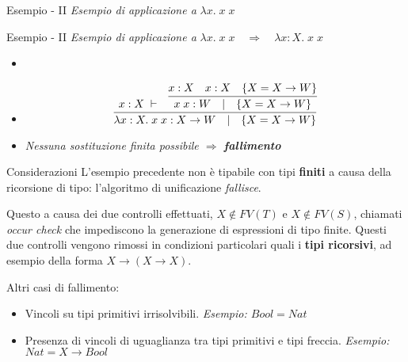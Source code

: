 \documentclass{beamer}
\begin{document}
\begin{tframe}{Esempio - II}
\emph{Esempio di applicazione a } $\lambda x.\; x \; x$
\end{tframe}

\begin{tframe}{Esempio - II}
\emph{Esempio di applicazione a } $\lambda x.\; x \; x \quad \Rightarrow \quad \lambda x : X.\; x \; x $
\begin{itemize}
\item<1->[]
\item<2->[]
\begin{displaymath}
\infer{\lambda x : X. \; x \; x : X \rightarrow W \quad | \quad \{ X = X \rightarrow W \}}{x : X \; \vdash & \infer{x \; x : W \quad | \quad \{X = X \rightarrow W \}}{x : X & x : X & \{X = X \rightarrow W\}}}
\end{displaymath}
\item<2->[] \vspace{0.8cm}\emph{Nessuna sostituzione finita possibile $\Rightarrow$ \textbf{fallimento}}
\end{itemize}
\end{tframe}


\begin{tframe}{Considerazioni}
L'esempio precedente non è tipabile con tipi \textbf{finiti} a causa della ricorsione di tipo: l'algoritmo di unificazione \emph{fallisce}.

Questo a causa dei due controlli effettuati, $X \not \in FV(T)$ e $X \not \in FV(S)$, chiamati \emph{occur check} che impediscono la generazione di espressioni di tipo finite. Questi due controlli vengono rimossi in condizioni particolari quali i \textbf{tipi ricorsivi}, ad esempio della forma $X \rightarrow (X \rightarrow X)$.

\vspace{0.5cm}

Altri casi di fallimento:
\begin{itemize}
\item Vincoli su tipi primitivi irrisolvibili. \emph{Esempio: $Bool = Nat$}
\item Presenza di vincoli di uguaglianza tra tipi primitivi e tipi freccia. \emph{Esempio: $Nat = X \rightarrow Bool$}
\end{itemize}
\end{tframe}
\end{document}
